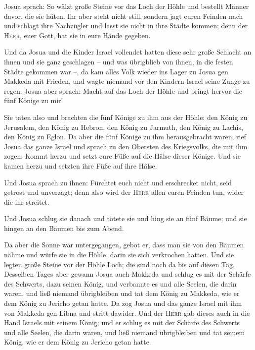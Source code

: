  Josua sprach: So wälzt große Steine vor das Loch der
Höhle und bestellt Männer davor, die sie hüten.  Ihr aber
steht nicht still, sondern jagt euren Feinden nach und schlagt ihre
Nachzügler und lasst sie nicht in ihre Städte kommen; denn der
\textsc{Herr}, euer Gott, hat sie in eure Hände gegeben.

 Und da Josua und die Kinder Israel vollendet hatten
diese sehr große Schlacht an ihnen und sie ganz geschlagen -- und was
übrigblieb von ihnen, in die festen Städte gekommen war --,
 da kam alles Volk wieder ins Lager zu Josua gen Makkeda
mit Frieden, und wagte niemand vor den Kindern Israel seine Zunge zu
regen.  Josua aber sprach: Macht auf das Loch der Höhle
und bringt hervor die fünf Könige zu mir!

 Sie taten also und brachten die fünf Könige zu ihm aus
der Höhle: den König zu Jerusalem, den König zu Hebron, den König zu
Jarmuth, den König zu Lachis, den König zu Eglon.  Da
aber die fünf Könige zu ihm herausgebracht waren, rief Josua das ganze
Israel und sprach zu den Obersten des Kriegsvolks, die mit ihm zogen:
Kommt herzu und setzt eure Füße auf die Hälse dieser Könige. Und sie
kamen herzu und setzten ihre Füße auf ihre Hälse.

 Und Josua sprach zu ihnen: Fürchtet euch nicht und
erschrecket nicht, seid getrost und unverzagt; denn also wird der
\textsc{Herr} allen euren Feinden tun, wider die ihr streitet.

 Und Josua schlug sie danach und tötete sie und hing sie
an fünf Bäume; und sie hingen an den Bäumen bis zum Abend.

 Da aber die Sonne war untergegangen, gebot er, dass man
sie von den Bäumen nähme und würfe sie in die Höhle, darin sie sich
verkrochen hatten. Und sie legten große Steine vor der Höhle Loch; die
sind noch da bis auf diesen Tag.  Desselben Tages aber
gewann Josua auch Makkeda und schlug es mit der Schärfe des Schwerts,
dazu seinen König, und verbannte es und alle Seelen, die darin waren,
und ließ niemand übrigbleiben und tat dem König zu Makkeda, wie er dem
König zu Jericho getan hatte.  Da zog Josua und das ganze
Israel mit ihm von Makkeda gen Libna und stritt dawider. 
Und der \textsc{Herr} gab dieses auch in die Hand Israels mit seinem
König; und er schlug es mit der Schärfe des Schwerts und alle Seelen,
die darin waren, und ließ niemand übrigbleiben und tat seinem König, wie
er dem König zu Jericho getan hatte.

